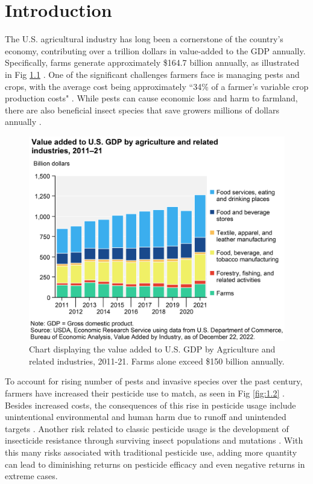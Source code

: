 \chapter{Introduction}

The U.S. agricultural industry has long been a cornerstone of the country's economy, contributing over a trillion dollars in value-added to the GDP annually. Specifically, farms generate approximately \$164.7 billion annually, as illustrated in Fig \ref{fig:1.1} \cite{zahniser_kassel_2023, depietro_2022}. One of the significant challenges farmers face is managing pests and crops, with the average cost being approximately ``34\% of a farmer's variable crop production costs" \cite{lrichmond_2007}. While pests can cause economic loss and harm to farmland, there are also beneficial insect species that save growers millions of dollars annually \cite{state_2010}.

\begin{figure}[H]
\begin{center}
\includegraphics[width=0.85\linewidth]{Honors_Thesis/Figures/1.1.png}
\end{center}
\caption{Chart displaying the value added to U.S. GDP by Agriculture and related industries, 2011-21. Farms alone exceed \$150 billion annually.}
\label{fig:1.1}
\end{figure}

To account for rising number of pests and invasive species over the past century, farmers have increased their pesticide use to match, as seen in Fig \ref{fig:1.2} \cite{nehring_fernandez-cornejo_vialou_martin_wechsler_osteen}. Besides increased costs, the consequences of this rise in pesticide usage include unintentional environmental and human harm due to runoff and unintended targets \cite{aktar_sengupta_chowdhury_2009}. Another risk related to classic pesticide usage is the development of insecticide resistance through surviving insect populations and mutations \cite{gut_mcmanus_isaacs_schilder}. With this many risks associated with traditional pesticide use, adding more quantity can lead to diminishing returns on pesticide efficacy and even negative returns in extreme cases.

